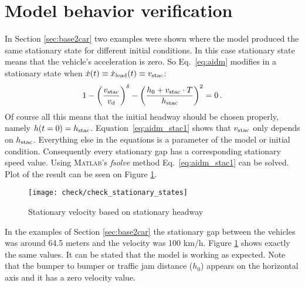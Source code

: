 	\section{Model behavior verification}
		In Section \ref{sec:base2car} two examples were shown where the model produced the same stationary state for different initial conditions. In this case stationary state means that the vehicle's acceleration is zero. So Eq.~\eqref{eq:aidm} modifies in a stationary state when $\dot{x}(t)\equiv \dot{x}_{\rm lead}(t)\equiv v_{\rm stac}$:
		\begin{equation}
		1 - \left ( \frac{v_{\rm stac}}{v_{\rm d}} \right )^{\rm \delta} - \left ( \frac{h_0+v_{\rm stac}\cdot T}{h_{\rm stac}} \right )^2=0\,.
		\label{eq:aidm_stac1}
		\end{equation}
		Of course all this means that the initial headway should be chosen properly, namely $h(t=0)=h_{\rm stac}$.
		Equation~\eqref{eq:aidm_stac1} shows that $v_{\rm stac}$ only depends on $h_{\rm stac}$. Everything else in the equations is a parameter of the model or initial condition. Consequently every stationary gap has a corresponding stationary speed value. Using \textsc{Matlab}'s \textit{fsolve} method Eq.~\eqref{eq:aidm_stac1} can be solved. Plot of the result can be seen on Figure \ref{fig:aidm_stac}.
		\begin{figure}
			\centering
			\texttt{[image: check/check\_stationary\_states]}
			\caption{Stationary velocity based on stationary headway}
			\label{fig:aidm_stac}
		\end{figure}

		In the examples of Section \ref{sec:base2car} the stationary gap between the vehicles was around 64.5 meters and the velocity was 100 km/h. Figure \ref{fig:aidm_stac} shows exactly the same values. It can be stated that the model is working as expected. Note that the bumper to bumper or traffic jam distance ($h_0$) appears on the horizontal axis and it has a zero velocity value.
